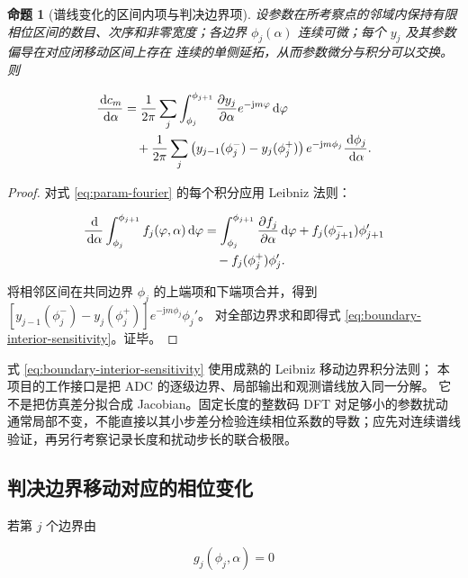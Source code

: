 \documentclass[11pt,a4paper]{ctexart}
\newcommand{\dd}{\,\mathrm{d}}
\newcommand{\jj}{\mathrm{j}}
\theoremstyle{adcplain}
\newtheorem{proposition}{命题}[section]
\theoremstyle{definition}
\begin{document}
\begin{proposition}[谱线变化的区间内项与判决边界项]
设参数在所考察点的邻域内保持有限相位区间的数目、次序和非零宽度；各边界
$\phi_j(\alpha)$ 连续可微；每个 $y_j$ 及其参数偏导在对应闭移动区间上存在
连续的单侧延拓，从而参数微分与积分可以交换。则

\begin{align}
  \frac{\dd c_m}{\dd\alpha}
  &=
  \frac{1}{2\pi}
  \sum_j
  \int_{\phi_j}^{\phi_{j+1}}
  \frac{\partial y_j}{\partial\alpha}
  e^{-\jj m\varphi}\dd\varphi \notag\\
  &\quad+
  \frac{1}{2\pi}
  \sum_j
  \left(y_{j-1}(\phi_j^-)-y_j(\phi_j^+)\right)
  e^{-\jj m\phi_j}
  \frac{\dd\phi_j}{\dd\alpha}.
  \label{eq:boundary-interior-sensitivity}
\end{align}
\end{proposition}

\begin{proof}
对式 \eqref{eq:param-fourier} 的每个积分应用 Leibniz 法则：

\begin{align}
  \frac{\dd}{\dd\alpha}
  \int_{\phi_j}^{\phi_{j+1}}f_j(\varphi,\alpha)\dd\varphi
  &=
  \int_{\phi_j}^{\phi_{j+1}}
  \frac{\partial f_j}{\partial\alpha}\dd\varphi
  +f_j(\phi_{j+1}^-)\phi_{j+1}'\notag\\
  &\quad-f_j(\phi_j^+)\phi_j'.
\end{align}

将相邻区间在共同边界 $\phi_j$ 的上端项和下端项合并，得到
$[y_{j-1}(\phi_j^-)-y_j(\phi_j^+)]e^{-\jj m\phi_j}\phi_j'$。
对全部边界求和即得式 \eqref{eq:boundary-interior-sensitivity}。证毕。
\end{proof}

式 \eqref{eq:boundary-interior-sensitivity} 使用成熟的 Leibniz 移动边界积分法则；
本项目的工作接口是把 ADC 的逐级边界、局部输出和观测谱线放入同一分解。
它不是把仿真差分拟合成 Jacobian。固定长度的整数码 DFT 对足够小的参数扰动
通常局部不变，不能直接以其小步差分检验连续相位系数的导数；应先对连续谱线
验证，再另行考察记录长度和扰动步长的联合极限。

\subsection{判决边界移动对应的相位变化}

若第 $j$ 个边界由

\begin{equation}
  g_j(\phi_j,\alpha)=0
  \label{eq:implicit-boundary}
\end{equation}
\end{document}
